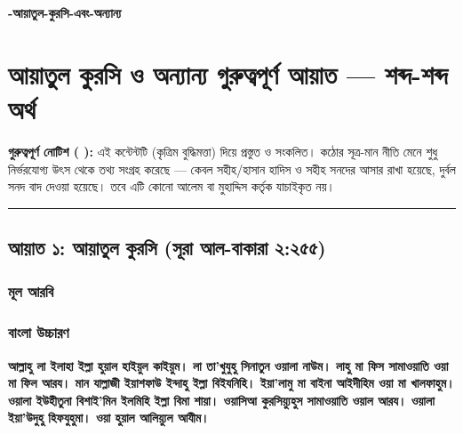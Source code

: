 

\begin{center}{\Large\bfseries\color{emerald} -আয়াতুল-কুরসি-এবং-অন্যান্য}\end{center}
\vspace{1em}
\section*{আয়াতুল কুরসি ও অন্যান্য গুরুত্বপূর্ণ আয়াত — শব্দ-শব্দ অর্থ}

\begin{warnbox}
 \textbf{গুরুত্বপূর্ণ নোটিশ ( ):} এই কন্টেন্টটি  (কৃত্রিম বুদ্ধিমত্তা) দিয়ে প্রস্তুত ও সংকলিত।  কঠোর সূত্র-মান নীতি মেনে শুধু নির্ভরযোগ্য উৎস থেকে তথ্য সংগ্রহ করেছে — কেবল সহীহ/হাসান হাদিস ও সহীহ সনদের আসার রাখা হয়েছে, দুর্বল সনদ বাদ দেওয়া হয়েছে। তবে এটি কোনো আলেম বা মুহাদ্দিস কর্তৃক যাচাইকৃত নয়।
\end{warnbox}

\medskip\hrule\medskip

\subsection*{আয়াত ১: আয়াতুল কুরসি (সূরা আল-বাকারা ২:২৫৫)}

\subsubsection*{মূল আরবি}
\begin{center}\end{center}

\subsubsection*{বাংলা উচ্চারণ}
\textbf{আল্লাহু লা ইলাহা ইল্লা হুয়াল হাইয়ুল কাইয়ুম। লা তা'খুযুহু সিনাতুন ওয়ালা নাউম। লাহু মা ফিস সামাওয়াতি ওয়া মা ফিল আরয। মান যাল্লাজী ইয়াশফাউ ইন্দাহু ইল্লা বিইযনিহি। ইয়া'লামু মা বাইনা আইদীহিম ওয়া মা খালফাহুম। ওয়ালা ইউহীতুনা বিশাই'মিন ইলমিহি ইল্লা বিমা শায়া। ওয়াসিআ কুরসিয়্যুহুস সামাওয়াতি ওয়াল আরয। ওয়ালা ইয়া'উদুহু হিফযুহুমা। ওয়া হুয়াল আলিয়্যুল আযীম।}

